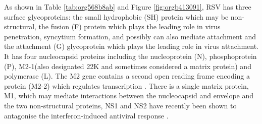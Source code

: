 \documentclass[10pt, a4paper]{article}
\begin{document}
As shown in Table \ref{tab:org568b8ab} and Figure \ref{fig:orgb413091}, RSV has three surface glycoproteins: the small
hydrophobic (SH) protein which may be non-structural, the fusion (F) protein
which plays the leading role in virus penetration, syncytium formation, and
possibly can also mediate attachment and the attachment (G) glycoprotein which
plays the leading role in virus attachment. It has four nucleocapsid proteins
including the nucleoprotein (N), phosphoprotein (P), M2-1(also designated 22K
and sometimes considered a matrix protein) and polymerase (L).
The M2 gene contains a second open reading frame encoding a protein (M2-2)
which regulates transcription \cite{fearnsRoleM21Transcription1999}.
There is a single matrix protein, M1, which may mediate interactions between the
nucleocapsid and envelope and the two non-structural proteins, NS1 and NS2  have
recently been shown to antagonise the interferon-induced antiviral response
\cite{fearnsRoleM21Transcription1999,schlenderBovineRespiratorySyncytial2000}.
\end{document}

